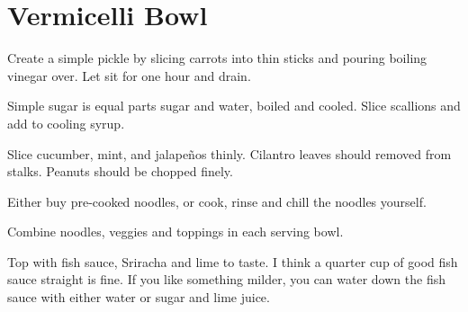 
\section{Vermicelli Bowl}
\begin{recipe}



Create a simple pickle by slicing carrots into thin sticks and pouring boiling vinegar over. Let sit for one hour and drain.


Simple sugar is equal parts sugar and water, boiled and cooled. Slice scallions and add to cooling syrup.


Slice cucumber, mint, and jalapeños thinly. Cilantro leaves should removed from stalks. Peanuts should be chopped finely.


Either buy pre-cooked noodles, or cook, rinse and chill the noodles yourself.

Combine noodles, veggies and toppings in each serving bowl.


Top with fish sauce, Sriracha and lime to taste. I think a quarter cup of good fish sauce straight is fine. If you like something milder, you can water down the fish sauce with either water or sugar and lime juice.


\end{recipe}
